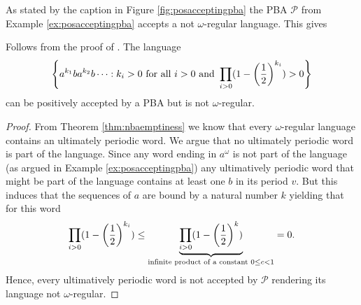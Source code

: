 As stated by the caption in Figure \ref{fig:posacceptingpba} the \ac{PBA}
$\mathcal{P}$ from Example \ref{ex:posacceptingpba} accepts a not
$\omega$-regular language. This gives
\begin{lemma}
  Follows from the proof of \cite[Theorem 4]{RecOmeLangProbAuto}.
  The language
  \begin{equation*}
    \left\{a^{k_{1}}ba^{k_{2}}b\dots:k_{i}>0\text{ for all }i>0\text{ and }
    \prod_{i>0}(1-\left(\frac{1}{2}\right)^{k_{i}}) > 0\right\}
  \end{equation*}
  can be positively accepted by a \ac{PBA} but is not $\omega$-regular.
  \label{lem:posaccpba>omegareg}
\end{lemma}
\begin{proof}
  From Theorem \ref{thm:nbaemptiness} we know that every $\omega$-regular 
  language contains an ultimately periodic word. We argue that no ultimately 
  periodic word is part of the language. Since any word ending in $a^{\omega}$ 
  is not part of the language (as argued in Example \ref{ex:posacceptingpba}) 
  any ultimatively periodic word that might be part of the language contains at 
  least one $b$ in its period $v$. But this induces that the sequences of $a$ 
  are bound by a natural number $k$ yielding that for this word
  \begin{equation*}
    \prod_{i>0}(1-\left(\frac{1}{2}\right)^{k_{i}}) \leq
    \underbrace{\prod_{i>0}(1-\left(\frac{1}{2}\right)^{k})}_{
      \text{infinite product of a constant }0\leq c<1} = 0.
  \end{equation*}
  Hence, every ultimatively periodic word is not accepted by $\mathcal{P}$
  rendering its language not $\omega$-regular.
\end{proof}

